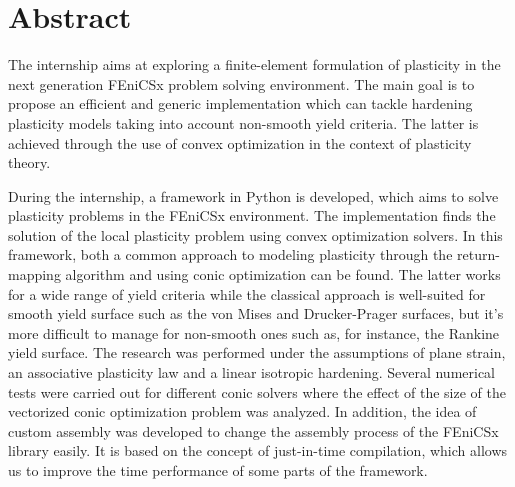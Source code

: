 \documentclass[12pt]{article}
\begin{document}


\newpage
\section*{\centering Abstract}

The internship aims at exploring a finite-element formulation of plasticity in the next generation FEniCSx problem solving environment. The main goal is to propose an efficient and generic implementation which can tackle hardening plasticity models taking into account non-smooth yield criteria. The latter is achieved through the use of convex optimization in the context of plasticity theory.

During the internship, a framework in Python is developed, which aims to solve plasticity problems in the FEniCSx environment. The implementation finds the solution of the local plasticity problem using convex optimization solvers. In this framework, both a common approach to modeling plasticity through the return-mapping algorithm and using conic optimization can be found. The latter works for a wide range of yield criteria while the classical approach is well-suited for smooth yield surface such as the von Mises and Drucker-Prager surfaces, but it's more difficult to manage for non-smooth ones such as, for instance, the Rankine yield surface. The research was performed under the assumptions of plane strain, an associative plasticity law and a linear isotropic hardening. Several numerical tests were carried out for different conic solvers where the effect of the size of the vectorized conic optimization problem was analyzed. In addition, the idea of custom assembly was developed to change the assembly process of the FEniCSx library easily. It is based on the concept of just-in-time compilation, which allows us to improve the time performance of some parts of the framework.
\end{document}
